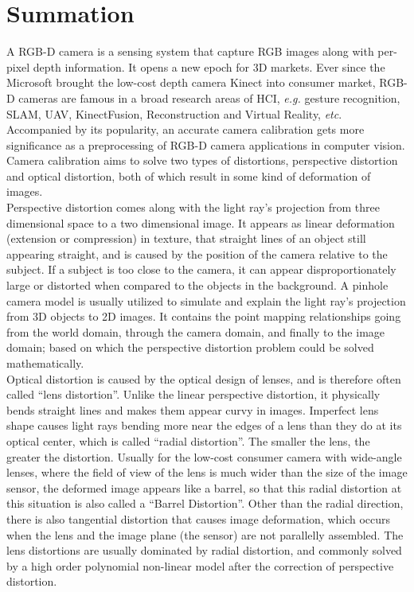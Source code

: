 \section{Summation}
\label{sectionLastSecInCh1}
\indent
A RGB-D camera is a sensing system that capture RGB images along with per-pixel depth information. It opens a new epoch for 3D markets. Ever since the Microsoft brought the low-cost depth camera Kinect into consumer market, RGB-D cameras are famous in a broad research areas of HCI, \textit{e.g.} gesture recognition, SLAM, UAV, KinectFusion, Reconstruction and Virtual Reality, \textit{etc}. Accompanied by its popularity, an accurate camera calibration gets more significance as a preprocessing of RGB-D camera applications in computer vision. Camera calibration aims to solve two types of distortions, perspective distortion and optical distortion, both of which result in some kind of deformation of images.
\\\indent
Perspective distortion comes along with the light ray's projection from three dimensional space to a two dimensional image. It appears as linear deformation (extension or compression) in texture, that straight lines of an object still appearing straight, and is caused by the position of the camera relative to the subject. If a subject is too close to the camera, it can appear disproportionately large or distorted when compared to the objects in the background. A pinhole camera model is usually utilized to simulate and explain the light ray's projection from 3D objects to 2D images. It contains the point mapping relationships going from the world domain, through the camera domain, and finally to the image domain; based on which the perspective distortion problem could be solved mathematically.
\\\indent
Optical distortion is caused by the optical design of lenses, and is therefore often called \enquote{lens distortion}. Unlike the linear perspective distortion, it physically bends straight lines and makes them appear curvy in images. Imperfect lens shape causes light rays bending more near the edges of a lens than they do at its optical center, which is called \enquote{radial distortion}. The smaller the lens, the greater the distortion. Usually for the low-cost consumer camera with wide-angle lenses, where the field of view of the lens is much wider than the size of the image sensor, the deformed image appears like a barrel, so that this radial distortion at this situation is also called a \enquote{Barrel Distortion}. Other than the radial direction, there is also tangential distortion that causes image deformation, which occurs when the lens and the image plane (the sensor) are not parallelly assembled. The lens distortions are usually dominated by radial distortion, and commonly solved by a high order polynomial non-linear model after the correction of perspective distortion.
\\\indent





